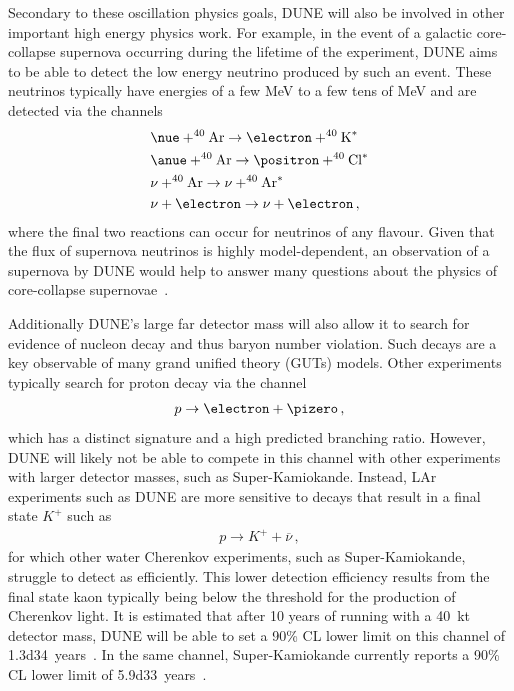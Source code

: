 Secondary to these oscillation physics goals, DUNE will also be involved in other important high energy physics work.
For example, in the event of a galactic core-collapse supernova occurring during the lifetime of the experiment, DUNE aims to be able to detect the low energy neutrino produced by such an event.
These neutrinos typically have energies of a few \si{\mega\electronvolt} to a few tens of \si{\mega\electronvolt} and are detected via the channels
\begin{align}
  &\nue + ^{40}\text{Ar} \rightarrow \electron + ^{40}\text{K}^{*} \\
  &\anue + ^{40}\text{Ar} \rightarrow \positron + ^{40}\text{Cl}^{*} \\
  &\nu + ^{40}\text{Ar} \rightarrow \nu + ^{40}\text{Ar}^{*} \\
  &\nu + \electron \rightarrow \nu + \electron \, ,
\end{align}
where the final two reactions can occur for neutrinos of any flavour.
Given that the flux of supernova neutrinos is highly model-dependent, an observation of a supernova by DUNE would help to answer many questions about the physics of core-collapse supernovae~\cite{duneSupernova}. 

Additionally DUNE's large far detector mass will also allow it to search for evidence of nucleon decay and thus baryon number violation.
Such decays are a key observable of many grand unified theory (GUTs) models.
Other experiments typically search for proton decay via the channel
\begin{align}
  p \rightarrow \electron + \pizero \, ,
\end{align}
which has a distinct signature and a high predicted branching ratio.
However, DUNE will likely not be able to compete in this channel with other experiments with larger detector masses, such as Super-Kamiokande.
Instead, LAr experiments such as DUNE are more sensitive to decays that result in a final state $K^{+}$ such as 
\begin{align}
  p \rightarrow K^{+} + \overline{\nu} \, ,
\end{align}
for which other water Cherenkov experiments, such as Super-Kamiokande, struggle to detect as efficiently.
This lower detection efficiency results from the final state kaon typically being below the threshold for the production of Cherenkov light.
It is estimated that after 10 years of running with a \SI{40}{\kilo\tonne} detector mass, DUNE will be able to set a 90\% CL lower limit on this channel of \num{1.3d34}~years~\cite{duneBSM}.
In the same channel, Super-Kamiokande currently reports a 90\% CL lower limit of \num{5.9d33}~years~\cite{SKProtonDecay}.

